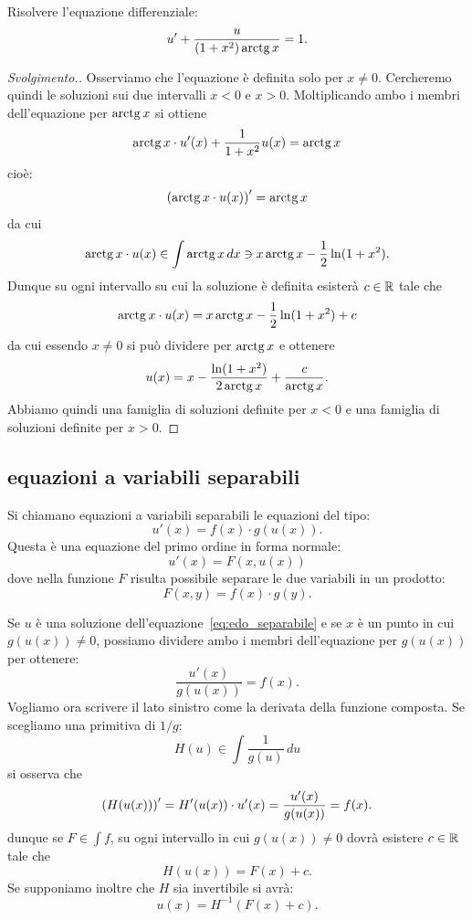 \begin{exercise}
Risolvere l'equazione differenziale:
\[
 u' + \frac{u}{(1+x^2)\operatorname{arctg} x} = 1.
\]
\end{exercise}
%
\begin{proof}[Svolgimento.]
Osserviamo che l'equazione è definita solo per $x\neq 0$. Cercheremo quindi le soluzioni sui due intervalli $x<0$ e $x>0$.
Moltiplicando ambo i membri dell'equazione per $\operatorname{arctg} x$ si ottiene
\[
  \operatorname{arctg} x \cdot u'(x) +\frac{1}{1+x^2} u(x) = \operatorname{arctg} x
\]
cioè:
\[
  {\left( \operatorname{arctg} x \cdot u(x) \right)}' = \operatorname{arctg} x
\]
da cui
\[
  \operatorname{arctg} x \cdot u(x) \in \int \operatorname{arctg} x\, dx \ni x \operatorname{arctg} x - \frac {1}{2}\ln(1+x^2).
\]
Dunque su ogni intervallo su cui la soluzione è definita esisterà
$c\in {\mathbb R}$ tale che
\[
  \operatorname{arctg} x \cdot u(x) = x \operatorname{arctg} x - \frac{1}{2}\ln(1+x^2) + c
\]
da cui essendo $x\neq 0$ si può dividere per $\operatorname{arctg} x$ e ottenere
\[
  u(x) = x - \frac{\ln(1+x^2)}{2\operatorname{arctg} x} + \frac{c}{\operatorname{arctg} x}.
\]
Abbiamo quindi una famiglia di soluzioni definite per $x<0$ e una famiglia di soluzioni definite per $x>0$.
\end{proof}

\subsection{equazioni a variabili separabili}

Si chiamano equazioni a variabili separabili le
equazioni del tipo:
\mymark{***}
\begin{equation}\label{eq:edo_separabile}
  u'(x) = f(x) \cdot g(u(x)).
\end{equation}
Questa è una equazione del primo ordine in forma normale:
\[
  u'(x) = F(x, u(x))
\]
dove nella funzione $F$ risulta possibile separare le
due variabili in un prodotto:
\[
  F(x, y) = f(x)\cdot g(y).
\]

Se $u$ è una soluzione dell'equazione~\eqref{eq:edo_separabile}
e se $x$ è un punto in cui $g(u(x))\neq 0$, possiamo dividere ambo i membri dell'equazione per $g(u(x))$ per ottenere:
\[
  \frac{u'(x)}{g(u(x))} = f(x).
\]
Vogliamo ora scrivere il lato sinistro come la derivata della funzione composta. Se scegliamo una primitiva di $1/g$:
\[
  H(u) \in \int \frac{1}{g(u)}\, du
\]
si osserva che
\[
  {\left( H(u(x)) \right)}' = H'(u(x))\cdot u'(x) = \frac{u'(x)}{g(u(x))} = f(x).
\]
dunque se $F\in \int f$, su ogni intervallo in cui $g(u(x))\neq 0$ dovrà esistere $c\in {\mathbb R}$ tale che
\[
  H(u(x)) = F(x) + c.
\]
Se supponiamo inoltre che $H$ sia invertibile si avrà:
\[
  u(x) = H^{-1}(F(x)+ c).
\]

